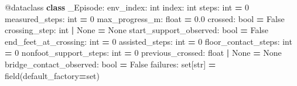 \documentclass[
  chinese,
  11pt,
  letterpaper,
]{article}
\newenvironment{Shaded}{\begin{snugshade}}{\end{snugshade}}
\newcommand{\AttributeTok}[1]{\textcolor[rgb]{0.13,0.29,0.53}{#1}}
\newcommand{\BuiltInTok}[1]{#1}
\newcommand{\DecValTok}[1]{\textcolor[rgb]{0.00,0.00,0.81}{#1}}
\newcommand{\FloatTok}[1]{\textcolor[rgb]{0.00,0.00,0.81}{#1}}
\newcommand{\KeywordTok}[1]{\textcolor[rgb]{0.13,0.29,0.53}{\textbf{#1}}}
\newcommand{\NormalTok}[1]{#1}
\newcommand{\OperatorTok}[1]{\textcolor[rgb]{0.81,0.36,0.00}{\textbf{#1}}}
\newcommand{\VariableTok}[1]{\textcolor[rgb]{0.00,0.00,0.00}{#1}}
\renewenvironment{Shaded}{\par\smallskip}{\par\smallskip}
\begin{document}
\begin{Shaded}
\begin{Highlighting}[]
\AttributeTok{@dataclass}
\KeywordTok{class}\NormalTok{ \_Episode:}
\NormalTok{    env\_index: }\BuiltInTok{int}
\NormalTok{    index: }\BuiltInTok{int}
\NormalTok{    steps: }\BuiltInTok{int} \OperatorTok{=} \DecValTok{0}
\NormalTok{    measured\_steps: }\BuiltInTok{int} \OperatorTok{=} \DecValTok{0}
\NormalTok{    max\_progress\_m: }\BuiltInTok{float} \OperatorTok{=} \FloatTok{0.0}
\NormalTok{    crossed: }\BuiltInTok{bool} \OperatorTok{=} \VariableTok{False}
\NormalTok{    crossing\_step: }\BuiltInTok{int} \OperatorTok{|} \VariableTok{None} \OperatorTok{=} \VariableTok{None}
\NormalTok{    start\_support\_observed: }\BuiltInTok{bool} \OperatorTok{=} \VariableTok{False}
\NormalTok{    end\_feet\_at\_crossing: }\BuiltInTok{int} \OperatorTok{=} \DecValTok{0}
\NormalTok{    assisted\_steps: }\BuiltInTok{int} \OperatorTok{=} \DecValTok{0}
\NormalTok{    floor\_contact\_steps: }\BuiltInTok{int} \OperatorTok{=} \DecValTok{0}
\NormalTok{    nonfoot\_support\_steps: }\BuiltInTok{int} \OperatorTok{=} \DecValTok{0}
\NormalTok{    previous\_crossed: }\BuiltInTok{float} \OperatorTok{|} \VariableTok{None} \OperatorTok{=} \VariableTok{None}
\NormalTok{    bridge\_contact\_observed: }\BuiltInTok{bool} \OperatorTok{=} \VariableTok{False}
\NormalTok{    failures: }\BuiltInTok{set}\NormalTok{[}\BuiltInTok{str}\NormalTok{] }\OperatorTok{=}\NormalTok{ field(default\_factory}\OperatorTok{=}\BuiltInTok{set}\NormalTok{)}


\end{Highlighting}
\end{Shaded}
\end{document}
